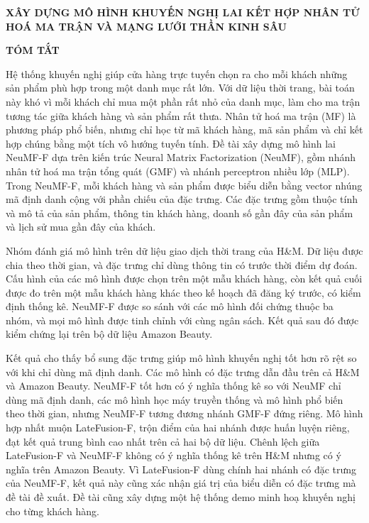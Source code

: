 \newpage
\begin{center}
{\fontsize{15pt}{18pt}\selectfont \textbf{XÂY DỰNG MÔ HÌNH KHUYẾN NGHỊ LAI KẾT HỢP NHÂN TỬ HOÁ MA TRẬN VÀ MẠNG LƯỚI THẦN KINH SÂU}\par}
\vspace{0.3cm}
{\fontsize{16pt}{19.2pt}\selectfont \textbf{TÓM TẮT}\par}
\end{center}
\vspace{0.15cm}

Hệ thống khuyến nghị giúp cửa hàng trực tuyến chọn ra cho mỗi khách những sản phẩm phù hợp trong một danh mục rất lớn. Với dữ liệu thời trang, bài toán này khó vì mỗi khách chỉ mua một phần rất nhỏ của danh mục, làm cho ma trận tương tác giữa khách hàng và sản phẩm rất thưa. Nhân tử hoá ma trận (MF) là phương pháp phổ biến, nhưng chỉ học từ mã khách hàng, mã sản phẩm và chỉ kết hợp chúng bằng một tích vô hướng tuyến tính. Đề tài xây dựng mô hình lai NeuMF-F dựa trên kiến trúc Neural Matrix Factorization (NeuMF), gồm nhánh nhân tử hoá ma trận tổng quát (GMF) và nhánh perceptron nhiều lớp (MLP). Trong NeuMF-F, mỗi khách hàng và sản phẩm được biểu diễn bằng vector nhúng mã định danh cộng với phần chiếu của đặc trưng. Các đặc trưng gồm thuộc tính và mô tả của sản phẩm, thông tin khách hàng, doanh số gần đây của sản phẩm và lịch sử mua gần đây của khách.

Nhóm đánh giá mô hình trên dữ liệu giao dịch thời trang của H\&M. Dữ liệu được chia theo thời gian, và đặc trưng chỉ dùng thông tin có trước thời điểm dự đoán. Cấu hình của các mô hình được chọn trên một mẫu khách hàng, còn kết quả cuối được đo trên một mẫu khách hàng khác theo kế hoạch đã đăng ký trước, có kiểm định thống kê. NeuMF-F được so sánh với các mô hình đối chứng thuộc ba nhóm, và mọi mô hình được tinh chỉnh với cùng ngân sách. Kết quả sau đó được kiểm chứng lại trên bộ dữ liệu Amazon Beauty.

Kết quả cho thấy bổ sung đặc trưng giúp mô hình khuyến nghị tốt hơn rõ rệt so với khi chỉ dùng mã định danh. Các mô hình có đặc trưng dẫn đầu trên cả H\&M và Amazon Beauty. NeuMF-F tốt hơn có ý nghĩa thống kê so với NeuMF chỉ dùng mã định danh, các mô hình học máy truyền thống và mô hình phổ biến theo thời gian, nhưng NeuMF-F tương đương nhánh GMF-F đứng riêng. Mô hình hợp nhất muộn LateFusion-F, trộn điểm của hai nhánh được huấn luyện riêng, đạt kết quả trung bình cao nhất trên cả hai bộ dữ liệu. Chênh lệch giữa LateFusion-F và NeuMF-F không có ý nghĩa thống kê trên H\&M nhưng có ý nghĩa trên Amazon Beauty. Vì LateFusion-F dùng chính hai nhánh có đặc trưng của NeuMF-F, kết quả này cũng xác nhận giá trị của biểu diễn có đặc trưng mà đề tài đề xuất. Đề tài cũng xây dựng một hệ thống demo minh hoạ khuyến nghị cho từng khách hàng.
